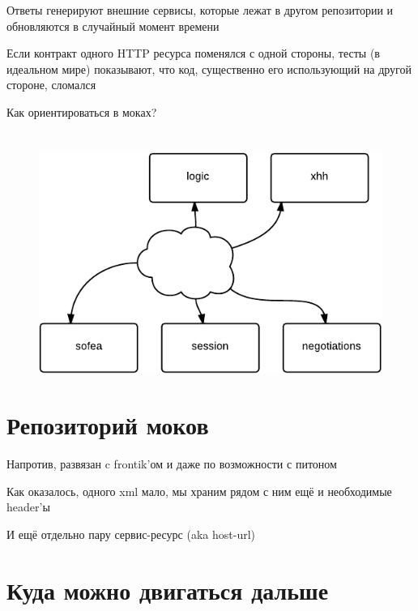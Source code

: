 \documentclass[12pt]{article}
\begin{document}
Ответы генерируют внешние сервисы, которые лежат в другом репозитории и обновляются в случайный момент времени

Если контракт одного HTTP ресурса поменялся с одной стороны, тесты (в идеальном мире) показывают, что код, существенно его использующий на другой стороне, сломался

Как ориентироваться в моках?

\section{}
\begin{figure}
\includegraphics[page=1, scale=2]{interconnection.pdf}
\end{figure}

\section{Репозиторий моков}

Напротив, развязан c frontik'ом и даже по возможности с питоном

Как оказалось, одного xml мало, мы храним рядом с ним ещё и необходимые header'ы

И ещё отдельно пару сервис-ресурс (aka host-url)

\section{Куда можно двигаться дальше}
\end{document}
